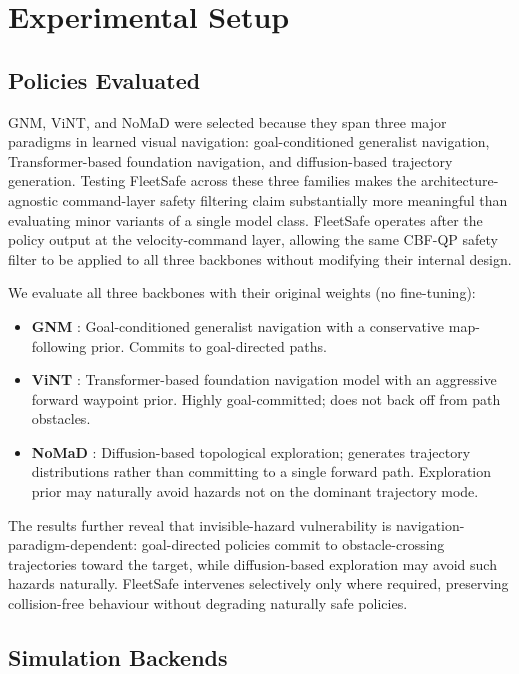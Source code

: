 \documentclass[letterpaper]{article}
\begin{document}
\section{Experimental Setup}
\label{sec:experiments}

\subsection{Policies Evaluated}
GNM, ViNT, and NoMaD were selected because they span three major paradigms
in learned visual navigation: goal-conditioned generalist navigation, Transformer-based
foundation navigation, and diffusion-based trajectory generation.
Testing FleetSafe across these three families makes the architecture-agnostic
command-layer safety filtering claim substantially more meaningful than evaluating
minor variants of a single model class.
FleetSafe operates after the policy output at the velocity-command layer,
allowing the same CBF-QP safety filter to be applied to all three backbones
without modifying their internal design.

We evaluate all three backbones with their original weights (no fine-tuning):
\begin{itemize}
  \item \textbf{GNM} \cite{shah2023gnm}: Goal-conditioned generalist navigation
    with a conservative map-following prior. Commits to goal-directed paths.
  \item \textbf{ViNT} \cite{majumdar2023vint}: Transformer-based foundation
    navigation model with an aggressive forward waypoint prior. Highly
    goal-committed; does not back off from path obstacles.
  \item \textbf{NoMaD} \cite{sridhar2024nomad}: Diffusion-based topological
    exploration; generates trajectory distributions rather than committing
    to a single forward path. Exploration prior may naturally avoid hazards
    not on the dominant trajectory mode.
\end{itemize}

The results further reveal that invisible-hazard vulnerability is
navigation-paradigm-dependent: goal-directed policies commit to
obstacle-crossing trajectories toward the target, while diffusion-based
exploration may avoid such hazards naturally. FleetSafe intervenes selectively
only where required, preserving collision-free behaviour without degrading
naturally safe policies.

\subsection{Simulation Backends}
\end{document}
